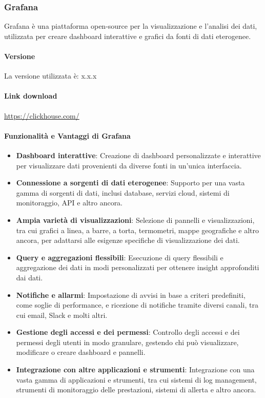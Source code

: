 \subsubsection{Grafana}
Grafana è una piattaforma open-source per la visualizzazione e l'analisi dei dati, utilizzata per creare dashboard interattive e grafici da fonti di dati eterogenee. 
\paragraph{Versione}
La versione utilizzata è: x.x.x
\paragraph{Link download}
\href{https://clickhouse.com/}{https://clickhouse.com/}

\paragraph{Funzionalità e Vantaggi di Grafana}
\begin{itemize}
    \item \textbf{Dashboard interattive}: Creazione di dashboard personalizzate e interattive per visualizzare dati provenienti da diverse fonti in un'unica interfaccia.
    
    \item \textbf{Connessione a sorgenti di dati eterogenee}: Supporto per una vasta gamma di sorgenti di dati, inclusi database, servizi cloud, sistemi di monitoraggio, API e altro ancora.
    
    \item \textbf{Ampia varietà di visualizzazioni}: Selezione di pannelli e visualizzazioni, tra cui grafici a linea, a barre, a torta, termometri, mappe geografiche e altro ancora, per adattarsi alle esigenze specifiche di visualizzazione dei dati.
    
    \item \textbf{Query e aggregazioni flessibili}: Esecuzione di query flessibili e aggregazione dei dati in modi personalizzati per ottenere insight approfonditi dai dati.
    
    \item \textbf{Notifiche e allarmi}: Impostazione di avvisi in base a criteri predefiniti, come soglie di performance, e ricezione di notifiche tramite diversi canali, tra cui email, Slack e molti altri.
    
    \item \textbf{Gestione degli accessi e dei permessi}: Controllo degli accessi e dei permessi degli utenti in modo granulare, gestendo chi può visualizzare, modificare o creare dashboard e pannelli.
    
    \item \textbf{Integrazione con altre applicazioni e strumenti}: Integrazione con una vasta gamma di applicazioni e strumenti, tra cui sistemi di log management, strumenti di monitoraggio delle prestazioni, sistemi di allerta e altro ancora.
    
   \end{itemize}
